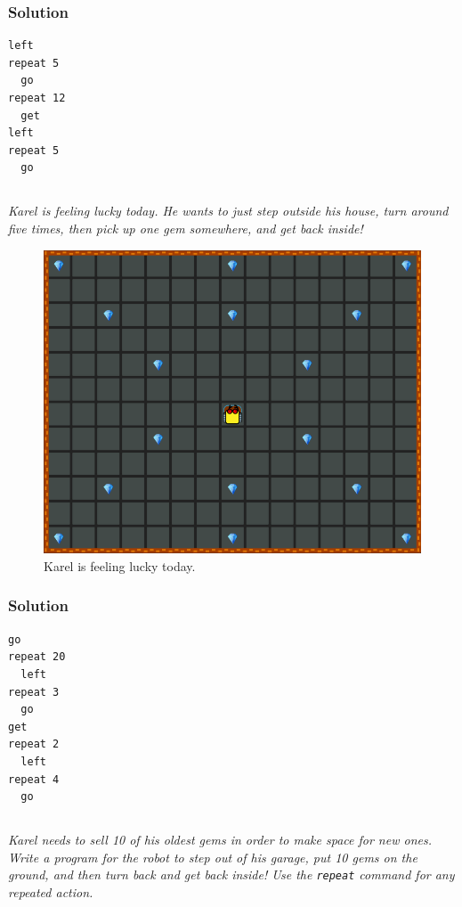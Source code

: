\documentclass[article,A4,12pt]{llncs}
\begin{document}
{{{{\subsubsection{Solution}
\begin{verbatim}
left
repeat 5
  go
repeat 12
  get
left
repeat 5
  go
\end{verbatim}

\newpage
\subsection{}

{\em Karel is feeling lucky today. He wants to just step outside his house, 
turn around five times, then pick up one gem somewhere, and get back inside!}


\begin{figure}[!ht]
\begin{center}
\includegraphics[height=0.4\textwidth]{imgk/c03.png}
\end{center}
\vspace{-4mm}
\caption{Karel is feeling lucky today.}
\label{fig:c03}
\vspace{-4mm}
\end{figure}
\noindent

\subsubsection{Solution}
\begin{verbatim}
go
repeat 20
  left
repeat 3 
  go
get
repeat 2
  left
repeat 4
  go
\end{verbatim}

\newpage
\subsection{}

{\em Karel needs to sell 10 of his oldest gems in order to make space for new ones. 
Write a program for the robot to step out of his garage, put 10 gems on the ground, 
and then turn back and get back inside! Use the {\tt repeat} command for any repeated 
action.}


}}}}
\end{document}
